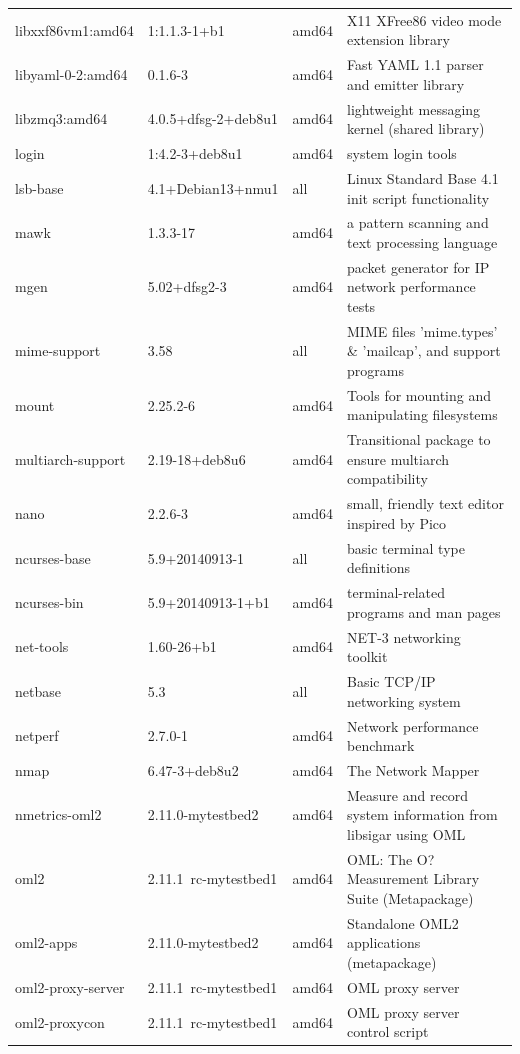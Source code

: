\documentclass[a4paper,10pt]{article}
\begin{document}
\begin{appendices}
{\begin{longtable}{p{3.25cm}@{\hspace{0.25cm}}p{4cm}@{\hspace{0.25cm}}l@{\hspace{0.25cm}}p{7cm}}
libxxf86vm1:amd64	&	1:1.1.3-1+b1	&	amd64	&	X11 XFree86 video mode extension library	\\
libyaml-0-2:amd64	&	0.1.6-3	&	amd64	&	Fast YAML 1.1 parser and emitter library	\\
libzmq3:amd64	&	4.0.5+dfsg-2+deb8u1	&	amd64	&	lightweight messaging kernel (shared library)	\\
login	&	1:4.2-3+deb8u1	&	amd64	&	system login tools	\\
lsb-base	&	4.1+Debian13+nmu1	&	all	&	Linux Standard Base 4.1 init script functionality	\\
mawk	&	1.3.3-17	&	amd64	&	a pattern scanning and text processing language	\\
mgen	&	5.02+dfsg2-3	&	amd64	&	packet generator for IP network performance tests	\\
mime-support	&	3.58	&	all	&	MIME files 'mime.types' \& 'mailcap', and support programs	\\
mount	&	2.25.2-6	&	amd64	&	Tools for mounting and manipulating filesystems	\\
multiarch-support	&	2.19-18+deb8u6	&	amd64	&	Transitional package to ensure multiarch compatibility	\\
nano	&	2.2.6-3	&	amd64	&	small, friendly text editor inspired by Pico	\\
ncurses-base	&	5.9+20140913-1	&	all	&	basic terminal type definitions	\\
ncurses-bin	&	5.9+20140913-1+b1	&	amd64	&	terminal-related programs and man pages	\\
net-tools	&	1.60-26+b1	&	amd64	&	NET-3 networking toolkit	\\
netbase	&	5.3	&	all	&	Basic TCP/IP networking system	\\
netperf	&	2.7.0-1	&	amd64	&	Network performance benchmark	\\
nmap	&	6.47-3+deb8u2	&	amd64	&	The Network Mapper	\\
nmetrics-oml2	&	2.11.0-mytestbed2	&	amd64	&	Measure and record system information from libsigar using OML	\\
oml2	&	2.11.1~rc-mytestbed1	&	amd64	&	OML: The O? Measurement Library Suite (Metapackage)	\\
oml2-apps	&	2.11.0-mytestbed2	&	amd64	&	Standalone OML2 applications (metapackage)	\\
oml2-proxy-server	&	2.11.1~rc-mytestbed1	&	amd64	&	OML proxy server	\\
oml2-proxycon	&	2.11.1~rc-mytestbed1	&	amd64	&	OML proxy server control script	\\

\end{longtable}}
\end{appendices}
\end{document}
